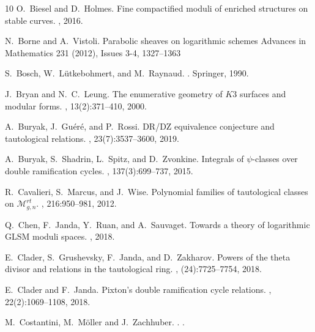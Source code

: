 \documentclass[a4paper,12pt]{article} %
\theoremstyle{definition}
\theoremstyle{plain}%
\begin{document}
\begin{thebibliography}{10}
O.~Biesel and D.~Holmes.
\newblock Fine compactified moduli of enriched structures on stable curves.
,
  2016.

N.~Borne and A.~Vistoli. 
\newblock Parabolic sheaves on logarithmic schemes
\newblock 	Advances in Mathematics 231 (2012), Issues 3-4, 1327--1363


S.~Bosch, W.~L{\"u}tkebohmert, and M.~Raynaud.
.
\newblock Springer, 1990.


J.~Bryan and N.~C.~Leung.
\newblock The enumerative geometry of {$K3$} surfaces and modular forms.
, 13(2):371--410, 2000.

A.~Buryak, J.~Gu\'{e}r\'{e}, and P.~Rossi.
\newblock D{R}/{DZ} equivalence conjecture and tautological relations.
, 23(7):3537--3600, 2019.

A.~Buryak, S.~Shadrin, L.~Spitz, and D.~Zvonkine.
\newblock Integrals of {$\psi$}-classes over double ramification cycles.
, 137(3):699--737, 2015.

R.~Cavalieri, S.~Marcus, and J.~Wise.
\newblock Polynomial families of tautological classes on
  $\mathcal{M}_{g,n}^{rt}$.
, 216:950--981, 2012.

Q.~Chen, F.~Janda, Y.~Ruan, and A.~Sauvaget.
\newblock Towards a theory of logarithmic {GLSM} moduli spaces.
, 2018.

E.~Clader, S.~Grushevsky, F.~Janda, and D.~Zakharov.
\newblock Powers of the theta divisor and relations in the tautological ring.
, (24):7725--7754, 2018.

E.~Clader and F.~Janda.
\newblock Pixton's double ramification cycle relations.
, 22(2):1069--1108, 2018.

M.~Costantini, M.~M\"oller and J.~Zachhuber.
.
.


\end{thebibliography}
\end{document}
